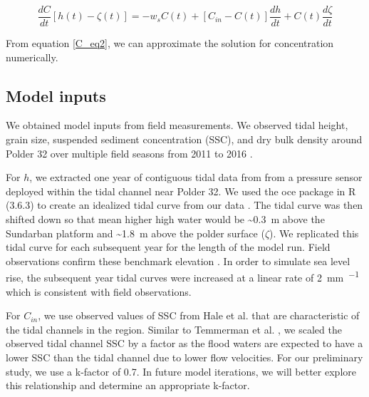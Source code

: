 \documentclass[a4paper,fleqn]{cas-sc}
\begin{document}
\begin{equation}\label{C_eq2}
	\frac{dC}{dt}[h(t) - \zeta(t)] = -w_sC(t) + [C_{in} - C(t)]\frac{dh}{dt} + C(t)\frac{d\zeta}{dt}
\end{equation}

From equation \ref{C_eq2}, we can approximate the solution for concentration numerically.


\subsection*{Model inputs}

We obtained model inputs from field measurements. We observed tidal height, grain size, suspended sediment concentration (SSC), and dry bulk density around Polder 32 over multiple field seasons from 2011 to 2016 \citet{auerbachFloodRiskNatural2015,haleObservationsScalingTidal2019,haleSeasonalVariabilityForces2019}.

For $h$, we extracted one year of contiguous tidal data from from a pressure sensor deployed within the tidal channel near Polder 32. We used the oce package in R (3.6.3) to create an idealized tidal curve from our data \citet{kelleyOceAnalysisOceanographic2020}. The tidal curve was then shifted down so that mean higher high water would be \SI{~0.3}{\meter} above the Sundarban platform and \SI{~1.8}{\meter} above the polder surface ($\zeta$). We replicated this tidal curve for each subsequent year for the length of the model run. Field observations confirm these benchmark elevation \citet{auerbachFloodRiskNatural2015,haleSeasonalVariabilityForces2019,bomerSurfaceElevationSedimentation2020}. In order to simulate sea level rise, the subsequent year tidal curves were increased at a linear rate of \SI{2}{\milli\meter\per\year} which is consistent with field observations.


For $C_{in}$, we use observed values of SSC from Hale et al. \citet{haleObservationsScalingTidal2019} that are characteristic of the tidal channels in the region. Similar to Temmerman et al. \citet{temmermanModellingLongtermTidal2003,temmermanModellingEstuarineVariations2004}, we scaled the observed tidal channel SSC by a factor as the flood waters are expected to have a lower SSC than the tidal channel due to lower flow velocities. For our preliminary study, we use a k-factor of 0.7. In future model iterations, we will better explore this relationship and determine an appropriate k-factor.
\end{document}
